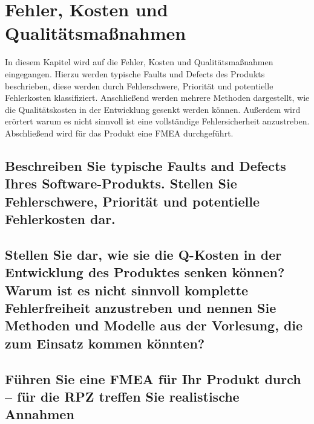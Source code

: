 \section{Fehler, Kosten und Qualitätsmaßnahmen}

In diesem Kapitel wird auf die Fehler, Kosten und Qualitätsmaßnahmen eingegangen.
Hierzu werden typische Faults und Defects des Produkts beschrieben, diese werden durch Fehlerschwere, Priorität und potentielle Fehlerkosten klassifiziert. 
Anschließend werden mehrere Methoden dargestellt, wie die Qualitätskosten in der Entwicklung gesenkt werden können.
Außerdem wird erörtert warum es nicht sinnvoll ist eine vollständige Fehlersicherheit anzustreben.
Abschließend wird für das Produkt eine \ac{FMEA} durchgeführt.

\subsection{Beschreiben Sie typische Faults and Defects Ihres Software-Produkts. Stellen Sie Fehlerschwere, Priorität und potentielle Fehlerkosten dar.}





\subsection{Stellen Sie dar, wie sie die Q-Kosten in der Entwicklung des Produktes senken können? Warum ist es nicht sinnvoll komplette Fehlerfreiheit anzustreben und nennen Sie Methoden und Modelle aus der Vorlesung, die zum Einsatz kommen könnten?}







\subsection{Führen Sie eine FMEA für Ihr Produkt durch – für die RPZ treffen Sie realistische Annahmen}





